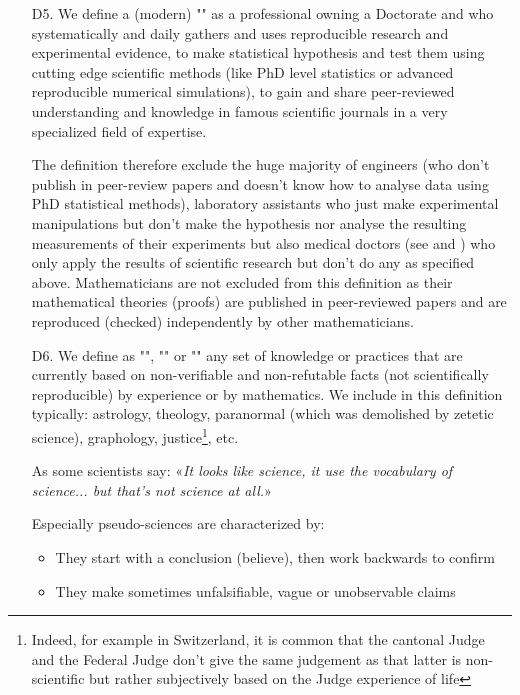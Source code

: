 \begin{itemize}
	\item[D5.] We define a (modern) "" as a professional owning a Doctorate and who systematically and daily gathers and uses reproducible research and experimental evidence, to make statistical hypothesis and test them using cutting edge scientific methods (like PhD level statistics or advanced reproducible numerical simulations), to gain and share peer-reviewed understanding and knowledge in famous scientific journals in a very specialized field of expertise.
	
	The definition therefore exclude the huge majority of engineers (who don't publish in peer-review papers and doesn't know how to analyse data using PhD statistical methods), laboratory assistants who just make experimental manipulations but don't make the hypothesis nor analyse the resulting measurements of their experiments but also medical doctors (see \cite{smith2004doctors} and \cite{freed2004doctors}) who only apply the results of scientific research but don't do any as specified above. Mathematicians are not excluded from this definition as their mathematical theories (proofs) are published in peer-reviewed papers and are reproduced (checked) independently by other mathematicians.

	\item[D6.] We define as "", "" or "" any set of knowledge or practices that are currently based on non-verifiable and non-refutable facts (not scientifically reproducible) by experience or by mathematics. We include in this definition typically: astrology, theology, paranormal (which was demolished by zetetic science), graphology, justice\footnote{Indeed, for example in Switzerland, it is common that the cantonal Judge and the Federal Judge don't give the same judgement as that latter is non-scientific but rather subjectively based on the Judge experience of life}, etc. 
	
	As some scientists say: «\textit{It looks like science, it use the vocabulary of science... but that's not science at all.}»
	
	Especially pseudo-sciences are characterized by:
	\begin{itemize}
		\item They start with a conclusion (believe), then work backwards to confirm

		\item They make sometimes unfalsifiable, vague or unobservable claims 
		

\end{itemize}
\end{itemize}

